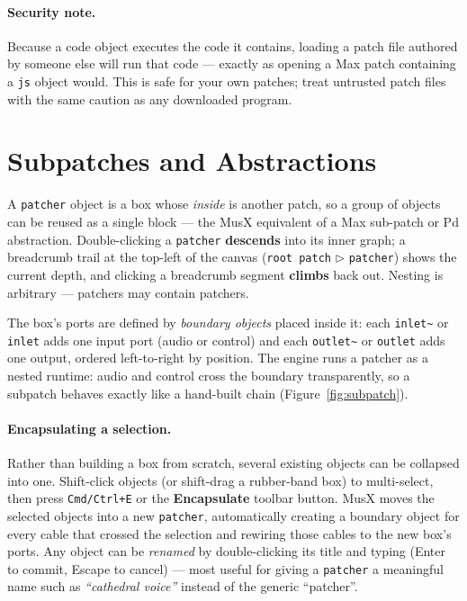 \documentclass[11pt,letterpaper]{article}
\begin{document}
\paragraph{Security note.} Because a code object executes the code it contains, loading a
patch file authored by someone else will run that code --- exactly as opening a Max patch
containing a \texttt{js} object would. This is safe for your own patches; treat untrusted
patch files with the same caution as any downloaded program.

\section{Subpatches and Abstractions}
\label{sec:subpatch}

A \texttt{patcher} object is a box whose \emph{inside} is another patch, so a group of objects
can be reused as a single block --- the MusX equivalent of a Max sub-patch or Pd abstraction.
Double-clicking a \texttt{patcher} \textbf{descends} into its inner graph; a breadcrumb trail at
the top-left of the canvas (\texttt{root patch} $\triangleright$ \texttt{patcher}) shows the current depth, and
clicking a breadcrumb segment \textbf{climbs} back out. Nesting is arbitrary --- patchers may
contain patchers.

The box's ports are defined by \emph{boundary objects} placed inside it: each \texttt{inlet\~{}}
or \texttt{inlet} adds one input port (audio or control) and each \texttt{outlet\~{}} or
\texttt{outlet} adds one output, ordered left-to-right by position. The engine runs a patcher as
a nested runtime: audio and control cross the boundary transparently, so a subpatch behaves
exactly like a hand-built chain (Figure~\ref{fig:subpatch}).

\paragraph{Encapsulating a selection.} Rather than building a box from scratch, several existing
objects can be collapsed into one. Shift-click objects (or shift-drag a rubber-band box) to
multi-select, then press \texttt{Cmd/Ctrl+E} or the \textbf{Encapsulate} toolbar button. MusX
moves the selected objects into a new \texttt{patcher}, automatically creating a boundary object
for every cable that crossed the selection and rewiring those cables to the new box's ports.
Any object can be \emph{renamed} by double-clicking its title and typing (Enter to commit, Escape
to cancel) --- most useful for giving a \texttt{patcher} a meaningful name such as
\emph{``cathedral voice''} instead of the generic ``patcher''.
\end{document}
